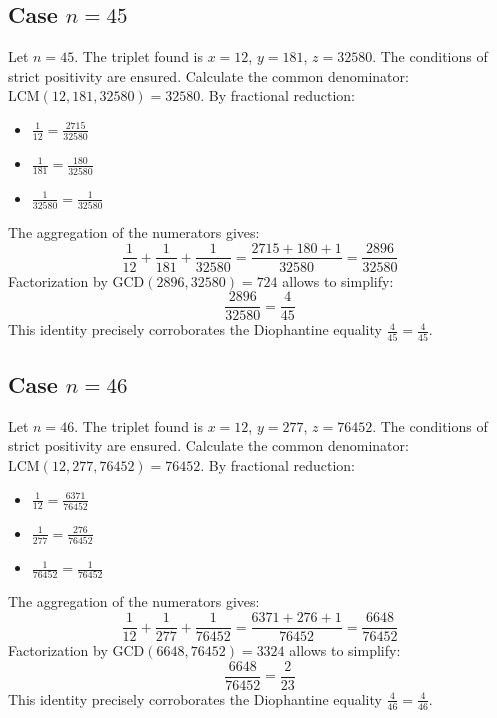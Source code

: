 \documentclass[11pt,a4paper]{article}
\begin{document}
\subsection{Case $n = 45$}
Let $n = 45$. The triplet found is $x = 12$, $y = 181$, $z = 32580$.
The conditions of strict positivity are ensured.
Calculate the common denominator: $\text{LCM}(12, 181, 32580) = 32580$.
By fractional reduction:
\begin{itemize}
    \item $\frac{1}{12} = \frac{2715}{32580}$
    \item $\frac{1}{181} = \frac{180}{32580}$
    \item $\frac{1}{32580} = \frac{1}{32580}$
\end{itemize}
The aggregation of the numerators gives:
$$ \frac{1}{12} + \frac{1}{181} + \frac{1}{32580} = \frac{2715 + 180 + 1}{32580} = \frac{2896}{32580} $$
Factorization by $\text{GCD}(2896, 32580) = 724$ allows to simplify:
$$ \frac{2896}{32580} = \frac{4}{45} $$
This identity precisely corroborates the Diophantine equality $\frac{4}{45} = \frac{4}{45}$.

\subsection{Case $n = 46$}
Let $n = 46$. The triplet found is $x = 12$, $y = 277$, $z = 76452$.
The conditions of strict positivity are ensured.
Calculate the common denominator: $\text{LCM}(12, 277, 76452) = 76452$.
By fractional reduction:
\begin{itemize}
    \item $\frac{1}{12} = \frac{6371}{76452}$
    \item $\frac{1}{277} = \frac{276}{76452}$
    \item $\frac{1}{76452} = \frac{1}{76452}$
\end{itemize}
The aggregation of the numerators gives:
$$ \frac{1}{12} + \frac{1}{277} + \frac{1}{76452} = \frac{6371 + 276 + 1}{76452} = \frac{6648}{76452} $$
Factorization by $\text{GCD}(6648, 76452) = 3324$ allows to simplify:
$$ \frac{6648}{76452} = \frac{2}{23} $$
This identity precisely corroborates the Diophantine equality $\frac{4}{46} = \frac{4}{46}$.
\end{document}
